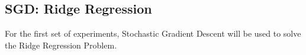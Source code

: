 \subsection{SGD: Ridge Regression}
For the first set of experiments, Stochastic Gradient Descent will be used to solve the Ridge Regression Problem. 